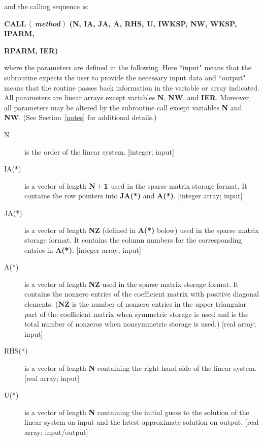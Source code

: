\bigskip
\noindent 
and the calling sequence is: 

\bigskip 
\centerline{\bf CALL $\langle$ {\em method} $\rangle$ (N, IA, JA, A, RHS, U, IWKSP, 
                NW, WKSP, IPARM,}
\centerline{\bf RPARM, IER)}
\bigskip
 
\noindent
where the parameters are defined in the following.  Here ``input" means
that the subroutine expects the user to provide the necessary input data
and ``output" means that the routine passes back information in the
variable or array indicated.  All parameters are linear arrays except
variables {\bf N}, {\bf NW}, and {\bf IER}.  Moreover, all parameters may
be altered by the subroutine call except variables {\bf N} and 
{\bf NW}.  (See Section~\ref{notes} for additional details.)

\bigskip
\begin{description}
 \item[N] is the order of the linear system.  [integer; input] 

 \item[IA(*)] is a vector of length ${\bf N+1}$ used in the sparse 
              matrix storage format.  It contains the row pointers 
              into {\bf JA(*)} and {\bf A(*)}.  [integer array; input] 

 \item[JA(*)] is a vector of length {\bf NZ} (defined in {\bf A(*)} below) 
              used in the sparse matrix storage format.  It contains 
              the column numbers for the corresponding entries in 
              {\bf A(*)}.  [integer array; input] 

 \item[A(*)] is a vector of length {\bf NZ} used in the sparse matrix 
             storage format.  It contains the nonzero entries of the 
             coefficient matrix with positive diagonal elements. 
             ({\bf NZ} is the number of nonzero entries in the upper 
             triangular part of the coefficient matrix when symmetric 
             storage is used and is the total number of nonzeros when 
             nonsymmetric storage is used.)  [real array; input] 

 \item[RHS(*)] is a vector of length {\bf N} containing the right-hand side 
               of the linear system.  [real array; input] 

 \item[U(*)] is a vector of length {\bf N} containing the initial guess 
             to the solution of the linear system on input and the 
             latest approximate solution on output.  [real array; 
             input/output] 


\end{description}
